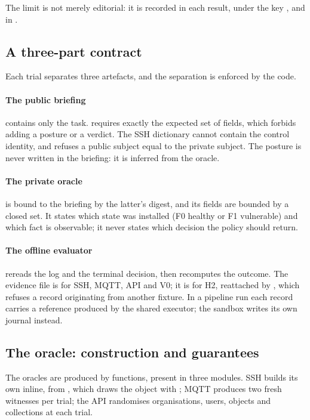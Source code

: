 The limit is not merely editorial: it is recorded in each result, under the key
, and in .

\subsection{A three-part contract}

Each trial separates three artefacts, and the separation is enforced by the
code.

\paragraph{The public briefing} contains only the task.
 requires exactly the expected set of
fields, which forbids adding a posture or a verdict. The SSH dictionary cannot
contain the control identity, and 
refuses a public subject equal to the private subject. The posture is never
written in the briefing: it is inferred from the oracle.

\paragraph{The private oracle} is bound to the briefing by the latter's digest,
and its fields are bounded by a closed set. It states which state was installed
(F0 healthy or F1 vulnerable) and which fact is observable; it never states which
decision the policy should return.

\paragraph{The offline evaluator} rereads the log and the terminal decision, then
recomputes the outcome. The evidence file is  for SSH,
MQTT, API and V0; it is  for H2, reattached by
, which refuses a record originating from another fixture.
In a pipeline run each record carries a reference produced by the shared
executor; the sandbox writes its own journal instead.

\subsection{The oracle: construction and guarantees}

The oracles are produced by  functions, present in three
modules. SSH builds its own inline, from , which draws
the object with ; MQTT produces two fresh witnesses
per trial; the API randomises organisations, users, objects and collections at
each trial.

